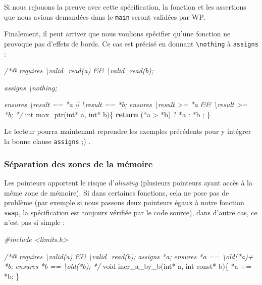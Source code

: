 \documentclass[12pt,francais,]{scrbook}
\newenvironment{Shaded}{}{}
\newcommand{\KeywordTok}[1]{\textcolor[rgb]{0.00,0.44,0.13}{\textbf{{#1}}}}
\newcommand{\DataTypeTok}[1]{\textcolor[rgb]{0.56,0.13,0.00}{{#1}}}
\newcommand{\CommentTok}[1]{\textcolor[rgb]{0.38,0.63,0.69}{\textit{{#1}}}}
\newcommand{\NormalTok}[1]{{#1}}
\begin{document}
Si nous rejouons la preuve avec cette spécification, la fonction et les
assertions que nous avions demandées dans le \texttt{main} seront
validées par WP.

Finalement, il peut arriver que nous voulions spécifier qu'une fonction
ne provoque pas d'effets de bords. Ce cas est précisé en donnant
\texttt{\textbackslash{}nothing} à \texttt{assigns} :

\begin{footnotesize}\begin{Shaded}
\begin{Highlighting}[]
\CommentTok{/*@}
\CommentTok{  requires \textbackslash{}valid_read(a) && \textbackslash{}valid_read(b);}

\CommentTok{  assigns  \textbackslash{}nothing;}

\CommentTok{  ensures \textbackslash{}result == *a || \textbackslash{}result == *b;}
\CommentTok{  ensures \textbackslash{}result >= *a && \textbackslash{}result >= *b;}
\CommentTok{*/}
\DataTypeTok{int} \NormalTok{max_ptr(}\DataTypeTok{int}\NormalTok{* a, }\DataTypeTok{int}\NormalTok{* b)\{}
  \KeywordTok{return} \NormalTok{(*a > *b) ? *a : *b ;}
\NormalTok{\}}
\end{Highlighting}
\end{Shaded}\end{footnotesize}

Le lecteur pourra maintenant reprendre les exemples précédents pour y
intégrer la bonne clause \texttt{assigns} ;) .

\subsubsection{Séparation des zones de la
mémoire}\label{suxe9paration-des-zones-de-la-muxe9moire}

Les pointeurs apportent le risque d'\emph{aliasing} (plusieurs pointeurs
ayant accès à la même zone de mémoire). Si dans certaines fonctions,
cela ne pose pas de problème (par exemple si nous passons deux pointeurs
égaux à notre fonction \texttt{swap}, la spécification est toujours
vérifiée par le code source), dans d'autre cas, ce n'est pas si simple :



\begin{footnotesize}\begin{Shaded}
\begin{Highlighting}[]
\CommentTok{#include <limits.h>}

\CommentTok{/*@}
\CommentTok{  requires \textbackslash{}valid(a) && \textbackslash{}valid_read(b);}
\CommentTok{  assigns  *a;}
\CommentTok{  ensures  *a == \textbackslash{}old(*a)+ *b;}
\CommentTok{  ensures  *b == \textbackslash{}old(*b);}
\CommentTok{*/}
\DataTypeTok{void} \NormalTok{incr_a_by_b(}\DataTypeTok{int}\NormalTok{* a, }\DataTypeTok{int} \DataTypeTok{const}\NormalTok{* b)\{}
  \NormalTok{*a += *b;}
\NormalTok{\}}
\end{Highlighting}
\end{Shaded}\end{footnotesize}
\end{document}
